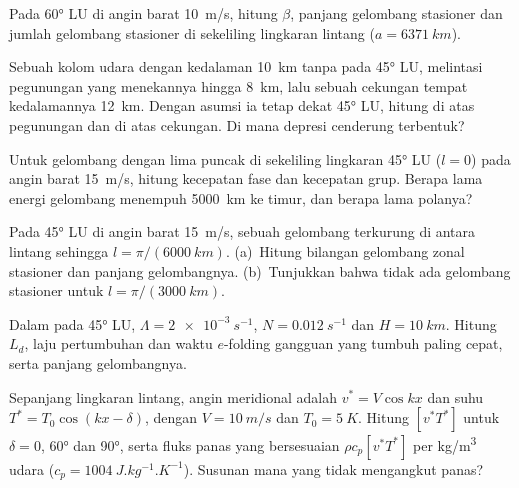 \begin{exercise}[$\star$]\label{exo:b3:atmospheric-dynamics:4}
Pada \ang{60} LU di angin barat \qty{10}{m/s}, hitung $\beta$, panjang
gelombang stasioner dan jumlah gelombang stasioner di sekeliling
lingkaran lintang ($a = \qty{6371}{km}$).
\end{exercise}

\begin{exercise}[$\star\star$]\label{exo:b3:atmospheric-dynamics:5}
Sebuah kolom udara dengan kedalaman \qty{10}{km} tanpa  pada \ang{45}
LU, melintasi pegunungan yang menekannya hingga \qty{8}{km}, lalu sebuah cekungan
tempat kedalamannya \qty{12}{km}. Dengan asumsi ia tetap dekat \ang{45} LU, hitung
 di atas pegunungan dan di atas cekungan. Di mana
depresi cenderung terbentuk?
\end{exercise}

\begin{exercise}[$\star\star$]\label{exo:b3:atmospheric-dynamics:6}
Untuk gelombang dengan lima puncak di sekeliling lingkaran \ang{45} LU ($l = 0$) pada
angin barat \qty{15}{m/s}, hitung kecepatan fase dan kecepatan grup.
Berapa lama energi gelombang menempuh \qty{5000}{km} ke timur, dan berapa
lama polanya?
\end{exercise}

\begin{exercise}[$\star\star$]\label{exo:b3:atmospheric-dynamics:7}
Pada \ang{45} LU di angin barat \qty{15}{m/s}, sebuah gelombang terkurung di antara
lintang sehingga $l = \pi/(\qty{6000}{km})$. (a)~Hitung bilangan gelombang
zonal stasioner dan panjang gelombangnya. (b)~Tunjukkan bahwa tidak ada gelombang stasioner untuk
$l = \pi/(\qty{3000}{km})$.
\end{exercise}

\begin{exercise}[$\star\star$]\label{exo:b3:atmospheric-dynamics:8}
Dalam  pada \ang{45} LU, $\Lambda = \qty{2e-3}{s^{-1}}$, $N =
\qty{0.012}{s^{-1}}$ dan $H = \qty{10}{km}$. Hitung $L_d$, laju pertumbuhan
dan waktu $e$-folding gangguan yang tumbuh paling cepat, serta
panjang gelombangnya.
\end{exercise}

\begin{exercise}[$\star\star$]\label{exo:b3:atmospheric-dynamics:9}
Sepanjang lingkaran lintang, angin meridional  adalah $v^* = V\cos kx$ dan
suhu  $T^* = T_0\cos(kx - \delta)$, dengan $V = \qty{10}{m/s}$ dan
$T_0 = \qty{5}{K}$. Hitung $[v^*T^*]$ untuk $\delta = 0$, \ang{60} dan
\ang{90}, serta fluks panas yang bersesuaian $\rho c_p[v^*T^*]$ per
\unit{kg/m^3} udara ($c_p = \qty{1004}{J.kg^{-1}.K^{-1}}$). Susunan mana
yang tidak mengangkut panas?
\end{exercise}

